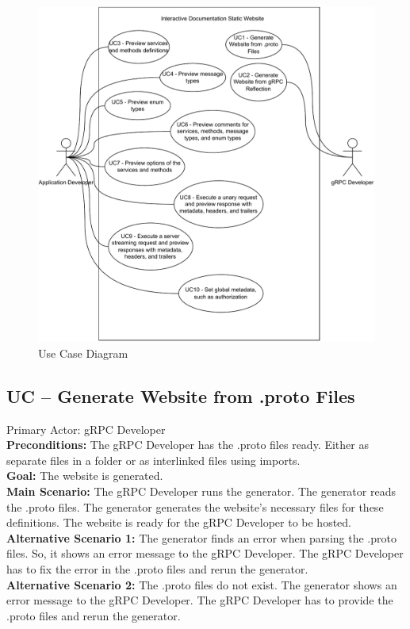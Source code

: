 \begin{figure}
    \centering
    \captionsetup{justification=centering}
    \includegraphics[width=1.0\textwidth]{images/use-case-diagram}
    \caption{Use Case Diagram}
    \label{fig:use-case-diagram}
\end{figure}


\newcommand{\usecase}[2]{%
    \subsection{UC -- #1}
}


\usecase{Generate Website from .proto Files}

\textbf{Primary Actor:} gRPC Developer\\
\textbf{Preconditions:} The gRPC Developer has the .proto files ready.
Either as separate files in a folder or as interlinked files using imports.\\
\textbf{Goal:} The website is generated.\\
\textbf{Main Scenario:}
The gRPC Developer runs the generator.
The generator reads the .proto files.
The generator generates the website's necessary files for these definitions.
The website is ready for the gRPC Developer to be hosted.\\
\textbf{Alternative Scenario 1:}
The generator finds an error when parsing the .proto files.
So, it shows an error message to the gRPC Developer.
The gRPC Developer has to fix the error in the .proto files and rerun the generator.\\
\textbf{Alternative Scenario 2:}
The .proto files do not exist.
The generator shows an error message to the gRPC Developer.
The gRPC Developer has to provide the .proto files and rerun the generator.

